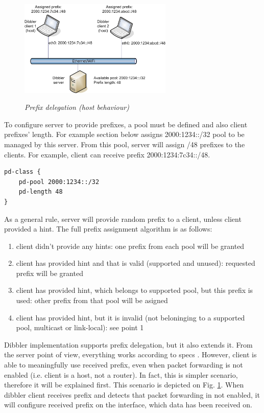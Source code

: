 \begin{figure}[ht]
\begin{center}
\label{fig-prefixes-host}
\includegraphics[width=0.65\textwidth]{dibbler-prefixes-host}
\caption{\emph{Prefix delegation (host behaviour)}}
\end{center}
\end{figure}

To configure server to provide prefixes, a pool must be defined and
also client prefixes' length. For example section below assigns
2000:1234::/32 pool to be managed by this server. From this pool,
server will assign /48 prefixes to the clients. For example, client
can receive prefix 2000:1234:7c34::/48. 

\begin{lstlisting}
pd-class {
    pd-pool 2000:1234::/32
    pd-length 48
}
\end{lstlisting}

As a general rule, server will provide random prefix to a client,
unless client provided a hint. The full prefix assignment algorithm is
as follows:

\begin{enumerate}
\item client didn't provide any hints: one prefix from each pool will
  be granted
\item client has provided hint and that is valid (supported and
  unused): requested prefix will be granted
\item client has provided hint, which belongs to supported pool, but this prefix is used:
  other prefix from that pool will be asigned
\item client has provided hint, but it is invalid (not beloninging to
  a supported pool, multicast or link-local): see point 1
\end{enumerate}

Dibbler implementation supports prefix delegation, but it also
extends it. From the server point of view, everything works according
to specs \cite{rfc3633}. However, client is able to meaningfully use
received prefix, even when packet forwarding is not enabled
(i.e. client is a host, not a router). In fact, this is simpler
scenario, therefore it will be explained first. This scenario is
depicted on Fig. \ref{fig-prefixes-host}. When dibbler client receives
prefix and detects that packet forwarding in not enabled, it will
configure received prefix on the interface, which data has been
received on.

